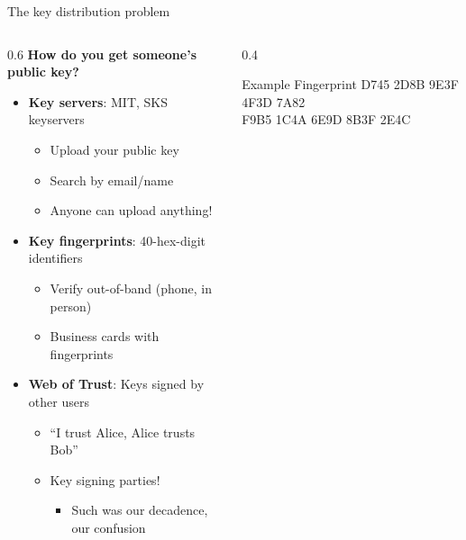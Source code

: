 \ifdefined\PRESENTATION\else\PassOptionsToClass{handout}{beamer}\fi\documentclass[aspectratio=169, lualatex]{beamer}
\begin{document}
\begin{frame}{The key distribution problem}
	\begin{columns}
		\begin{column}{0.6\textwidth}
			\textbf{How do you get someone's public key?}
			\begin{itemize}
				\item \textbf{Key servers}: MIT, SKS keyservers
				      \begin{itemize}
					      \item Upload your public key
					      \item Search by email/name
					      \item Anyone can upload anything!
				      \end{itemize}
				\item \textbf{Key fingerprints}: 40-hex-digit identifiers
				      \begin{itemize}
					      \item Verify out-of-band (phone, in person)
					      \item Business cards with fingerprints
				      \end{itemize}
				\item \textbf{Web of Trust}: Keys signed by other users
				      \begin{itemize}
					      \item ``I trust Alice, Alice trusts Bob''
					      \item Key signing parties!
					            \begin{itemize}
						            \item Such was our decadence, our confusion
					            \end{itemize}
				      \end{itemize}
			\end{itemize}
		\end{column}
		\begin{column}{0.4\textwidth}
			\begin{exampleblock}{Example Fingerprint}
				\ttfamily\scriptsize
				D745 2D8B 9E3F 4F3D 7A82\\
				F9B5 1C4A 6E9D 8B3F 2E4C
			\end{exampleblock}
		\end{column}
	\end{columns}
\end{frame}
\end{document}
